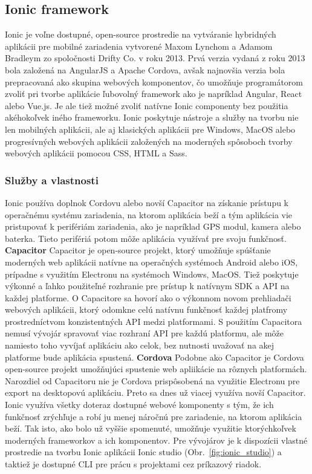 \subsection{Ionic framework}
\indent Ionic je voľne dostupné, open-source prostredie na vytváranie hybridných aplikácii pre mobilné zariadenia vytvorené Maxom Lynchom a Adamom Bradleym zo spoločnosti Drifty Co. v roku 2013. Prvá verzia vydaná z roku 2013 bola založená na AngularJS a Apache Cordova, avšak najnovšia verzia bola prepracovaná ako skupina webových komponentov, čo umožňuje programátorom zvoliť pri tvorbe aplikácie ľubovolný framework ako je napríklad Angular, React alebo Vue.js. Je ale tiež možné zvoliť natívne Ionic componenty bez použitia akéhokoľvek iného frameworku. Ionic poskytuje nástroje a služby na tvorbu nie len mobilných aplikácii, ale aj klasických aplikácii pre Windows, MacOS alebo progresívných webových aplikácii založených na moderných spôsoboch tvorby webových aplikácii pomocou CSS, HTML a Sass.

\subsubsection{Služby a vlastnosti}
\indent Ionic používa doplnok Cordovu alebo novší Capacitor na získanie prístupu k operačnému systému zariadenia, na ktorom aplikácia beží a tým aplikácia vie pristupovať k perifériám zariadenia, ako je napríklad GPS modul, kamera alebo baterka. Tieto perifériá potom môže aplikácia využívať pre svoju funkčnosť. \newline
\textbf{Capacitor}\newline
\indent Capacitor je open-source projekt, ktorý umožňuje spúšťanie moderných web aplikácii natívne na operačných systémoch Android alebo iOS, prípadne s využitím Electronu na systémoch Windows, MacOS. Tiež poskytuje výkonné a ľahko použiteľné rozhranie pre prístup k natívnym SDK a API na každej platforme. O Capacitore sa hovorí ako o výkonnom novom prehliadači webových aplikácii, ktorý odomkne celú natívnu funkčnosť každej platfromy prostredníctvom konzistentných API medzi platformami. S použitím Capacitora nemusí vývojár spravovať viac rozhraní API pre každú platformu, ale môže namiesto toho vyvíjať aplikáciu ako celok, bez nutnosti uvažovať na akej platforme bude aplikácia spustená\cite{ionic}. \newline
\textbf{Cordova}\newline
\indent Podobne ako Capacitor je Cordova open-source projekt umožňujúci spustenie web apliikácie na rôznych platformách. Narozdiel od Capacitoru nie je Cordova prispôsobená na využitie Electronu pre export na desktopovú aplikáciu. Preto sa dnes už viacej využíva novší Capacitor\cite{ionic}.
\indent Ionic využíva všetky doteraz dostupné webové komponenty s tým, že ich funkčnosť zrýchľuje a robí ju menej náročnú pre zariadenie, na ktorom aplikácia beží. Tak isto, ako bolo už vyššie spomenuté, umožňuje využitie ktorýchkoľvek moderných frameworkov a ich komponentov. Pre vývojárov je k dispozícii vlastné prostredie na tvorbu Ionic aplikácii Ionic studio (Obr.~\ref{fig:ionic_studio}) a taktiež je dostupné CLI pre prácu s projektami cez príkazový riadok. 

